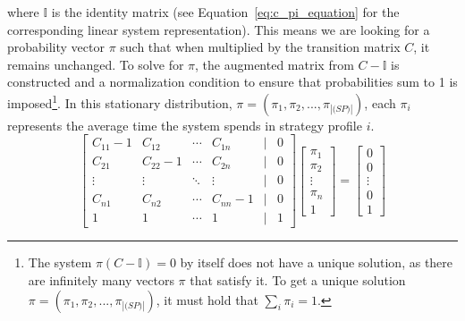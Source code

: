 \begin{flushleft}
\begin{flushleft}
        where $\mathbb{I}$ is the identity matrix (see Equation~\ref{eq:c_pi_equation} for the corresponding linear system representation). This means we are looking for a probability vector $\pi$ such that when multiplied by the transition matrix $C$, it remains unchanged. To solve for $\pi$, the augmented matrix from $C - \mathbb{I}$ is constructed and a normalization condition to ensure that probabilities sum to 1 is imposed\footnote{The system $\pi(C - \mathbb{I}) = 0$ by itself does not have a unique solution, as there are infinitely many vectors $\pi$ that satisfy it. To get a unique solution $\pi=(\pi_1,\pi_2,..., \pi_{|\mathcal(SP)|})$, it must hold that $\sum_{i} \pi_i = 1$.}. In this stationary distribution, $\pi=(\pi_1,\pi_2,..., \pi_{|\mathcal(SP)|})$, each $\pi_i$ represents the average time the system spends in strategy profile $i$.
        \begin{equation}
            \begin{bmatrix}
                C_{11} - 1 & C_{12} & \cdots & C_{1n} & | & 0 \\
                C_{21} & C_{22} - 1 & \cdots & C_{2n} & | & 0 \\
                \vdots & \vdots & \ddots & \vdots & | & 0 \\
                C_{n1} & C_{n2} & \cdots & C_{nn} - 1 & | & 0 \\
                1 & 1 & \cdots & 1 & | & 1
            \end{bmatrix}
            \begin{bmatrix}
                \pi_1 \\
                \pi_2 \\
                \vdots \\
                \pi_n \\
                1
            \end{bmatrix}
            =
            \begin{bmatrix}
                0 \\
                0 \\
                \vdots \\
                0 \\
                1
            \end{bmatrix}
        \label{eq:c_pi_equation}
        \end{equation}
    
    \end{flushleft}

\end{flushleft}